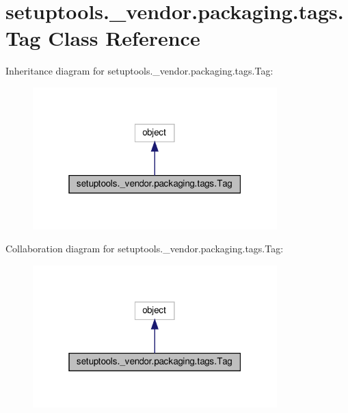 \hypertarget{classsetuptools_1_1__vendor_1_1packaging_1_1tags_1_1Tag}{}\section{setuptools.\+\_\+vendor.\+packaging.\+tags.\+Tag Class Reference}
\label{classsetuptools_1_1__vendor_1_1packaging_1_1tags_1_1Tag}


Inheritance diagram for setuptools.\+\_\+vendor.\+packaging.\+tags.\+Tag\+:
\nopagebreak
\begin{figure}[H]
\begin{center}
\leavevmode
\includegraphics[width=268pt]{classsetuptools_1_1__vendor_1_1packaging_1_1tags_1_1Tag__inherit__graph}
\end{center}
\end{figure}


Collaboration diagram for setuptools.\+\_\+vendor.\+packaging.\+tags.\+Tag\+:
\nopagebreak
\begin{figure}[H]
\begin{center}
\leavevmode
\includegraphics[width=268pt]{classsetuptools_1_1__vendor_1_1packaging_1_1tags_1_1Tag__coll__graph}
\end{center}
\end{figure}
